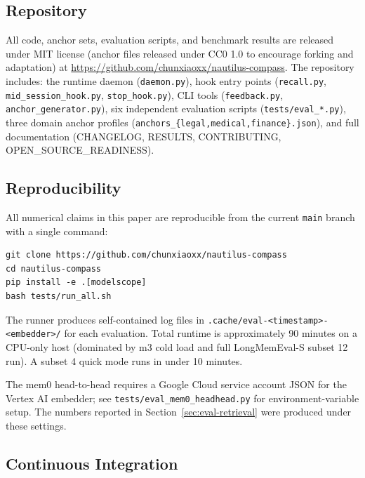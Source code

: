 
\subsection{Repository}
\label{sec:os-repo}

{\sloppy
All code, anchor sets, evaluation scripts, and benchmark results
are released under MIT license (anchor files released under
CC0 1.0 to encourage forking and adaptation) at
\url{https://github.com/chunxiaoxx/nautilus-compass}. The repository
includes: the runtime daemon (\texttt{daemon.py}), hook entry
points (\texttt{recall.py}, \texttt{mid\_session\_hook.py},
\texttt{stop\_hook.py}), CLI tools (\texttt{feedback.py},
\texttt{anchor\_generator.py}), six independent evaluation
scripts (\texttt{tests/eval\_*.py}), three domain anchor profiles
(\texttt{anchors\_\{legal,medical,finance\}.json}), and full
documentation (CHANGELOG, RESULTS, CONTRIBUTING, OPEN\_SOURCE\_READINESS).
\par}

\subsection{Reproducibility}
\label{sec:os-repro}

All numerical claims in this paper are reproducible from the
current \texttt{main} branch with a single command:

\begin{verbatim}
git clone https://github.com/chunxiaoxx/nautilus-compass
cd nautilus-compass
pip install -e .[modelscope]
bash tests/run_all.sh
\end{verbatim}

The runner produces self-contained log files in
\texttt{.cache/eval-<timestamp>-<embedder>/} for each evaluation.
Total runtime is approximately 90 minutes on a CPU-only host
(dominated by m3 cold load and full LongMemEval-S subset 12 run).
A subset 4 quick mode runs in under 10 minutes.

The mem0 head-to-head requires a Google Cloud service account
JSON for the Vertex AI embedder; see \texttt{tests/eval\_mem0\_headhead.py}
for environment-variable setup. The numbers reported in
Section~\ref{sec:eval-retrieval} were produced under these settings.

\subsection{Continuous Integration}
\label{sec:os-ci}

